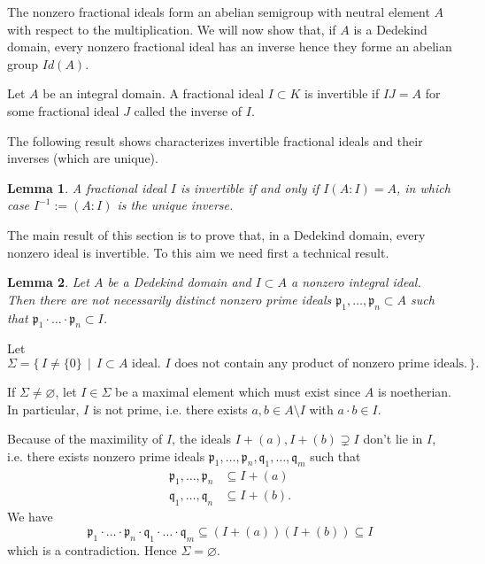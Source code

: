 \documentclass[a4paper]{book}
\theoremstyle{break}
\theoremstyle{plain}
\newtheorem{lemma}{Lemma}[definition]
\begin{document}
The nonzero fractional ideals form an abelian semigroup with neutral element \(A\) with respect to the multiplication. We will now show that, if \(A\) is a Dedekind domain, every nonzero fractional ideal has an inverse hence they forme an abelian group \(Id (A)\).

\begin{definition}
    Let \(A\) be an {\color{mathif}integral domain}. A {\color{mathif}fractional ideal} \(I \subset K\) is {\color{maththen}invertible} if \(IJ = A\) for some fractional ideal \(J\) called the {\color{mathrem}inverse} of \(I\).
\end{definition}

The following result shows characterizes invertible fractional ideals and their inverses (which are unique).

\begin{lemma}
    A fractional ideal \(I\) is invertible if and only if \(I (A : I) = A\), in which case \(I^{-1} := (A : I)\) is the unique inverse.
\end{lemma}


The main result of this section is to prove that, in a Dedekind domain, every nonzero ideal is invertible. To this aim we need first a technical result.

\begin{lemma}
    Let \(A\) be a {\color{mathif}Dedekind domain} and \(I \subset A\) a {\color{mathif}nonzero integral ideal}. Then there are not necessarily distinct {\color{maththen}nonzero prime ideals} \(\mathfrak{p}_1, \dots, \mathfrak{p}_n \subset A\) such that \(\mathfrak{p}_1 \cdot \dots \cdot \mathfrak{p}_n \subset I\).
\end{lemma}


Let
\begin{equation}
    \Sigma = \{\, I \neq \{0\} \, \mid \, I \subset A \text{ ideal. \(I\) does not contain any product of nonzero prime ideals.} \, \} \text{.}
\end{equation}

If \(\Sigma \neq \varnothing\), let \(I \in \Sigma\) be a maximal element which must exist since \(A\) is noetherian. In particular, \(I\) is not prime, i.e. there exists \(a, b \in A \setminus I\) with \(a \cdot b \in I\). %

Because of the maximility of \(I\), the ideals \(I + (a), I + (b) \supsetneq I\) don't lie in \(I\), i.e. there exists nonzero prime ideals \(\mathfrak{p}_1, \dots, \mathfrak{p}_n, \mathfrak{q}_1, \dots, \mathfrak{q}_m\) such that
\begin{align}
    \mathfrak{p}_1, \dots, \mathfrak{p}_n &\subseteq I + (a) \\
    \mathfrak{q}_1, \dots, \mathfrak{q}_n &\subseteq I + (b) \text{.}
\end{align}
We have
\begin{equation}
    \mathfrak{p}_1 \cdot \dots \cdot \mathfrak{p}_n \cdot \mathfrak{q}_1 \cdot \dots \cdot \mathfrak{q}_m \subseteq (I + (a))(I + (b)) \subseteq I
\end{equation}
which is a contradiction. Hence \(\Sigma = \varnothing\).
\end{document}
